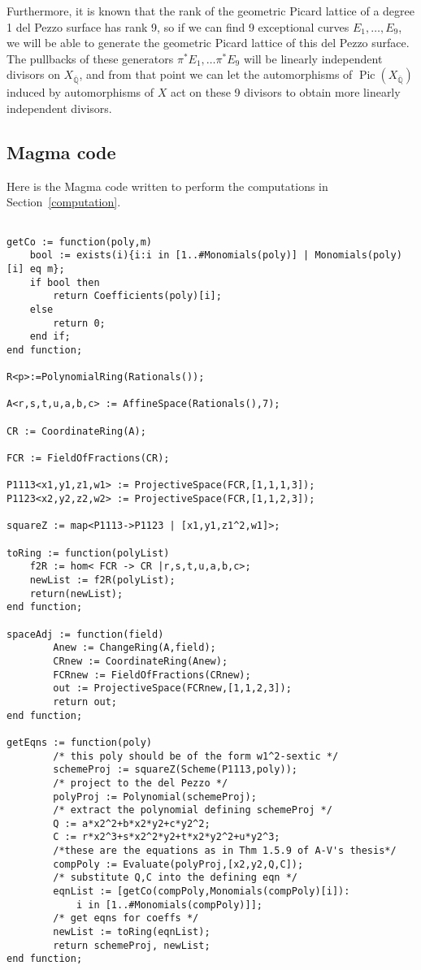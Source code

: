 \documentclass[12pt,twoside]{reedthesis}
\theoremstyle{plain}
\theoremstyle{definition}
\theoremstyle{remark}
\newcommand{\QQ}{\mathbb{Q}}
\newcommand{\Pic}{\operatorname{Pic}}
\begin{document}
Furthermore, it is known that the rank of the geometric Picard lattice of a degree 1 del Pezzo surface has rank 9, so if we can find 9 exceptional curves $E_1,\ldots, E_9$, we will be able to generate the geometric Picard lattice of this del Pezzo surface. The pullbacks of these generators $\pi^*E_1,\ldots\pi^*E_9$ will be linearly independent divisors on $X_{\overline{\QQ}}$, and from that point we can let the automorphisms of $\Pic(X_{\overline{\QQ}})$ induced by automorphisms of $X$ act on these 9 divisors to obtain more linearly independent divisors.
\begin{appendices}
\chapter{Magma code}
Here is the Magma code written to perform the computations in Section~\ref{computation}.
\begin{verbatim}

getCo := function(poly,m)
	bool := exists(i){i:i in [1..#Monomials(poly)] | Monomials(poly)[i] eq m};
	if bool then
		return Coefficients(poly)[i];
	else
		return 0;
	end if;
end function;

R<p>:=PolynomialRing(Rationals());

A<r,s,t,u,a,b,c> := AffineSpace(Rationals(),7);

CR := CoordinateRing(A);

FCR := FieldOfFractions(CR);

P1113<x1,y1,z1,w1> := ProjectiveSpace(FCR,[1,1,1,3]);
P1123<x2,y2,z2,w2> := ProjectiveSpace(FCR,[1,1,2,3]);

squareZ := map<P1113->P1123 | [x1,y1,z1^2,w1]>;

toRing := function(polyList)
	f2R := hom< FCR -> CR |r,s,t,u,a,b,c>;
	newList := f2R(polyList);
	return(newList);
end function;

spaceAdj := function(field) 
		Anew := ChangeRing(A,field);
		CRnew := CoordinateRing(Anew);
		FCRnew := FieldOfFractions(CRnew);
		out := ProjectiveSpace(FCRnew,[1,1,2,3]);
		return out;
end function;

getEqns := function(poly) 
		/* this poly should be of the form w1^2-sextic */
		schemeProj := squareZ(Scheme(P1113,poly)); 
		/* project to the del Pezzo */
		polyProj := Polynomial(schemeProj); 
		/* extract the polynomial defining schemeProj */	
		Q := a*x2^2+b*x2*y2+c*y2^2; 
		C := r*x2^3+s*x2^2*y2+t*x2*y2^2+u*y2^3; 
		/*these are the equations as in Thm 1.5.9 of A-V's thesis*/
		compPoly := Evaluate(polyProj,[x2,y2,Q,C]); 
		/* substitute Q,C into the defining eqn */
		eqnList := [getCo(compPoly,Monomials(compPoly)[i]): 
			i in [1..#Monomials(compPoly)]]; 
		/* get eqns for coeffs */
		newList := toRing(eqnList);
		return schemeProj, newList;
end function;


\end{verbatim}
\end{appendices}
\end{document}
